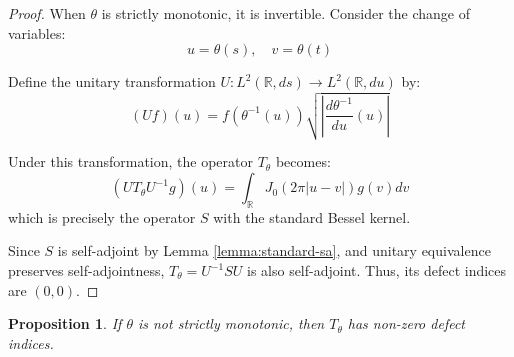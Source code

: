 \documentclass{article}
\newtheorem{proposition}[theorem]{Proposition}
\begin{document}
\begin{proof}
When $\theta$ is strictly monotonic, it is invertible. Consider the change of variables:
\begin{equation}
    u = \theta(s), \quad v = \theta(t)
\end{equation}

Define the unitary transformation $U: L^2(\mathbb{R}, ds) \to L^2(\mathbb{R}, du)$ by:
\begin{equation}
    (Uf)(u) = f(\theta^{-1}(u))\sqrt{\left|\frac{d\theta^{-1}}{du}(u)\right|}
\end{equation}

Under this transformation, the operator $T_\theta$ becomes:
\begin{equation}
    (UT_\theta U^{-1}g)(u) = \int_{\mathbb{R}} J_0(2\pi|u-v|)g(v)dv
\end{equation}
which is precisely the operator $S$ with the standard Bessel kernel.

Since $S$ is self-adjoint by Lemma \ref{lemma:standard-sa}, and unitary equivalence preserves self-adjointness, $T_\theta = U^{-1}SU$ is also self-adjoint. Thus, its defect indices are $(0,0)$.
\end{proof}

\begin{proposition}\label{prop:nonmonotonic-implies-defect}
If $\theta$ is not strictly monotonic, then $T_\theta$ has non-zero defect indices.
\end{proposition}
\end{document}
